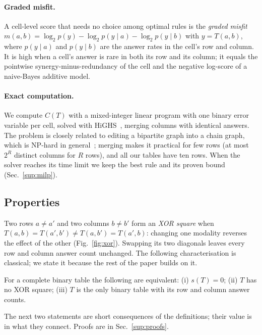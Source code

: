 \paragraph{Graded misfit.}
A cell-level score that needs no choice among optimal rules is the \emph{graded misfit}
$m(a,b)=\log_2 p(y)-\log_2 p(y\mid a)-\log_2 p(y\mid b)$ with $y=T(a,b)$, where $p(y\mid a)$ and $p(y\mid b)$ are the
answer rates in the cell's row and column. It is high when a cell's answer is rare in both its row and its column; it
equals the pointwise synergy-minus-redundancy of the cell and the negative log-score of a naive-Bayes additive model.

\paragraph{Exact computation.}
We compute $C(T)$ with a mixed-integer linear program with one binary error variable per cell, solved with
HiGHS~\cite{huang2024highs}, merging columns with identical answers. The problem is closely related to editing a
bipartite graph into a chain graph, which is NP-hard in general~\cite{yannakakis1981computing,natanzon2001complexity};
merging makes it practical for few rows (at most $2^{R}$ distinct columns for $R$ rows), and all our tables have ten
rows. When the solver reaches its time limit we keep the best rule and its proven bound (Sec.~\ref{sup:milp}).

\subsection{Properties}
\label{sec:properties}

Two rows $a\neq a'$ and two columns $b\neq b'$ form an \emph{XOR square} when
$T(a,b)=T(a',b')\neq T(a,b')=T(a',b)$: changing one modality reverses the effect of the other (Fig.~\ref{fig:xor}).
Swapping its two diagonals leaves every row and column answer count unchanged. The following characterisation is
classical; we state it because the rest of the paper builds on it.

\begin{theorem}
\label{thm:ferrers}
For a complete binary table the following are equivalent: (i) $s(T)=0$; (ii) $T$ has no XOR square; (iii) $T$ is the
only binary table with its row and column answer counts.
\end{theorem}

The next two statements are short consequences of the definitions; their value is in what they connect. Proofs are
in Sec.~\ref{sup:proofs}.

